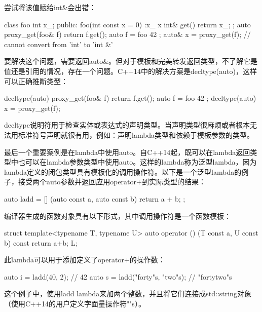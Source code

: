 尝试将该值赋给int\&会出错：

\begin{cpp}
class foo
{
    int x_;
public:
    foo(int const x = 0) :x_{ x } {}
    int& get() { return x_; }
};
auto proxy_get(foo& f) { return f.get(); }
auto f = foo{ 42 };
auto& x = proxy_get(f); // cannot convert from 'int' to 'int &'
\end{cpp}

要解决这个问题，需要返回auto\&。但对于模板和完美转发返回类型，不了解它是值还是引用的情况，存在一个问题。C++14中的解决方案是decltype(auto)，这样可以正确推断类型：

\begin{cpp}
decltype(auto) proxy_get(foo& f)
{ return f.get(); }
auto f = foo{ 42 };
decltype(auto) x = proxy_get(f);
\end{cpp}

decltype说明符用于检查实体或表达式的声明类型。当声明类型很麻烦或者根本无法用标准符号声明就很有用，例如：声明lambda类型和依赖于模板参数的类型。

最后一个重要案例是在lambda中使用auto。自C++14起，既可以在lambda返回类型中也可以在lambda参数类型中使用auto。这样的lambda称为泛型lambda，因为lambda定义的闭包类型具有模板化的调用操作符。以下是一个泛型lambda的例子，接受两个auto参数并返回应用operator+到实际类型的结果：

\begin{cpp}
auto ladd = [] (auto const a, auto const b) { return a + b; };
\end{cpp}

编译器生成的函数对象具有以下形式，其中调用操作符是一个函数模板：

\begin{cpp}
struct
{
    template<typename T, typename U>
    auto operator () (T const a, U const b) const { return a+b; }
} L;
\end{cpp}

此lambda可以用于添加定义了operator+的操作数：

\begin{cpp}
auto i = ladd(40, 2);            // 42
auto s = ladd("forty"s, "two"s); // "fortytwo"s
\end{cpp}

这个例子中，使用ladd lambda来加两个整数，并且将它们连接成std::string对象（使用C++14的用户定义字面量操作符""s）。























